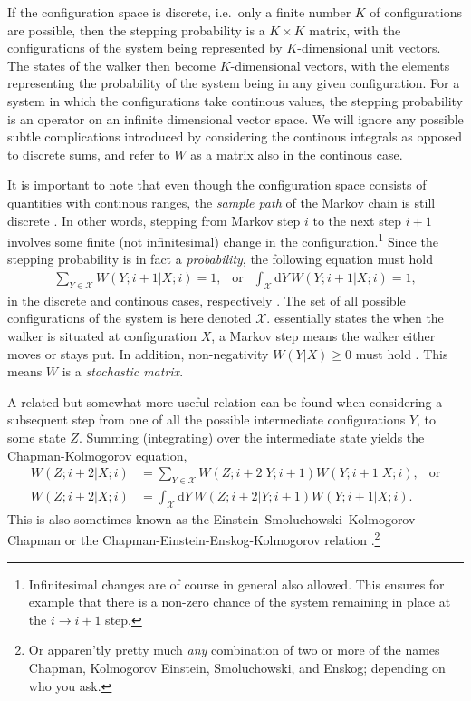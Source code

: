 \documentclass[../../master.tex]{subfiles}
\begin{document}
If the configuration space is discrete, i.e.\ only a finite number $K$ of configurations are possible, then the stepping probability is a $K\times K$ matrix, with the configurations of the system being represented by $K$-dimensional unit vectors. The states of the walker then become $K$-dimensional vectors, with  the elements representing the probability of the system being in any given configuration. For a system in which the configurations take continous values, the stepping probability is an operator on an infinite dimensional vector space. We will ignore any possible subtle complications introduced by considering the continous integrals as opposed to discrete sums, and refer to $W$ as a matrix also in the continous case.

It is important to note that even though the configuration space consists of quantities with continous ranges, the \emph{sample path} of the Markov chain is still discrete \cite{gardiner}. In other words, stepping from Markov step $i$ to the next step $i+1$ involves some finite (not infinitesimal) change in the configuration.\footnote{Infinitesimal changes are of course in general also allowed. This ensures for example that there is a non-zero chance of the system remaining in place at the $i\rightarrow i+1$ step.} Since the stepping probability is in fact a \emph{probability}, the following equation must hold
\begin{align}
\sum_{Y\in\mathcal{X}}W(Y;i+1|X;i)=1, \ \ \text{ or } \ \ \int_{\mathcal{X}}\mathrm{d}Y\,W(Y;i+1|X;i)=1, \label{eq:VMC2}
\end{align}
in the discrete and continous cases, respectively \cite{hammond}. The set of all possible configurations of the system is here denoted $\mathcal{X}$.  essentially states the when the walker is situated at configuration $X$, a Markov step means the walker either moves or stays put. In addition, non-negativity $W(Y|X)\ge0$ must hold \cite{assaraf}. This means $W$ is a \emph{stochastic matrix}. 

A related but somewhat more useful relation can be found when considering a subsequent step from one of all the possible intermediate configurations $Y$, to some state $Z$. Summing (integrating) over the intermediate state yields the Chapman-Kolmogorov equation, \cite{gardiner}
\begin{align}
W(Z;i+2|X;i) &= \sum_{Y\in\mathcal{X}}W(Z;i+2|Y;i+1)W(Y;i+1|X;i), \ \ \text{ or} \\
% 
W(Z;i+2|X;i) &= \int_{\mathcal{X}}\mathrm{d}Y\,W(Z;i+2|Y;i+1)W(Y;i+1|X;i). \label{eq:VMC3}
\end{align}
This is also sometimes known as the Einstein–Smoluchowski–Kolmogorov–Chapman or the Chapman-Einstein-Enskog-Kolmogorov relation \cite{chaichian,hjorth-jensen}.\footnote{Or apparen'tly pretty much \emph{any} combination of two or more of the names Chapman, Kolmogorov Einstein, Smoluchowski, and Enskog; depending on who you ask.} 
\end{document}
